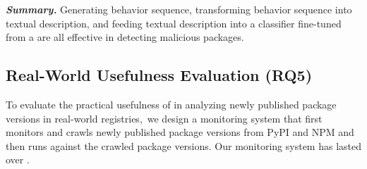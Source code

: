 \textbf{\textit{Summary.}} Generating behavior sequence, transforming behavior sequence into textual description, and feeding textual description into a classifier fine-tuned from a  are all effective in detecting malicious packages. 


% 

\subsection{Real-World Usefulness Evaluation (RQ5)}

To evaluate the practical usefulness of \tool in analyzing newly published package versions in real-world registries,~we design a monitoring system that first monitors and crawls newly published package versions from PyPI and NPM and then runs \tool against the crawled package versions. Our monitoring system has lasted over .

